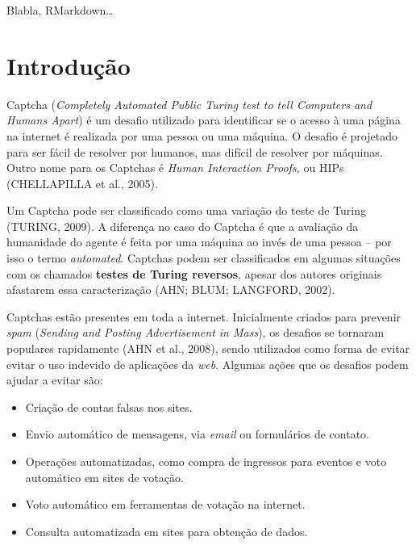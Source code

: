 \documentclass[12pt,twoside,brazilian]{book}
\providecommand{\tightlist}{%
  \setlength{\itemsep}{0pt}\setlength{\parskip}{0pt}}
\begin{document}

Blabla, RMarkdown\ldots{}


\hypertarget{introducao}{%
\chapter{Introdução}\label{introducao}}


Captcha (\emph{Completely Automated Public Turing test to tell Computers
and Humans Apart}) é um desafio utilizado para identificar se o acesso à
uma página na internet é realizada por uma pessoa ou uma máquina. O
desafio é projetado para ser fácil de resolver por humanos, mas difícil
de resolver por máquinas. Outro nome para os Captchas é \emph{Human
Interaction Proofs,} ou HIPs (CHELLAPILLA et al., 2005).

Um Captcha pode ser classificado como uma variação do teste de Turing
(TURING, 2009). A diferença no caso do Captcha é que a avaliação da
humanidade do agente é feita por uma máquina ao invés de uma pessoa --
por isso o termo \emph{automated}. Captchas podem ser classificados em
algumas situações com os chamados \textbf{testes de Turing reversos},
apesar dos autores originais afastarem essa caracterização (AHN; BLUM;
LANGFORD, 2002).

Captchas estão presentes em toda a internet. Inicialmente criados para
prevenir \emph{spam} (\emph{Sending and Posting Advertisement in Mass}),
os desafios se tornaram populares rapidamente (AHN et al., 2008), sendo
utilizados como forma de evitar evitar o uso indevido de aplicações da
\emph{web}. Algumas ações que os desafios podem ajudar a evitar são:

\begin{itemize}
\tightlist
\item
  Criação de contas falsas nos sites.
\item
  Envio automático de mensagens, via \emph{email} ou formulários de
  contato.
\item
  Operações automatizadas, como compra de ingressos para eventos e voto
  automático em sites de votação.
\item
  Voto automático em ferramentas de votação na internet.
\item
  Consulta automatizada em sites para obtenção de dados.
\end{itemize}
\end{document}
